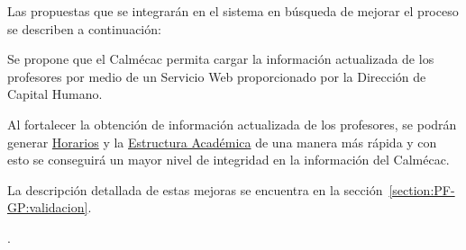 	Las propuestas que se integrarán en el sistema  en búsqueda de mejorar el proceso se describen a continuación:  
	
\begin{Citemize}
	\item Se propone que el Calmécac permita cargar la información actualizada de los profesores por medio de un Servicio Web proporcionado por la Dirección de Capital Humano.
	\item Al fortalecer la obtención de información actualizada de los profesores, se podrán generar \hyperlink{PF:PF-PHR}{Horarios} y la  \hyperlink{PF:PF-EA}{Estructura Académica} de una manera más rápida y con esto se conseguirá un mayor nivel de integridad en la información del Calmécac.
	
		La descripción detallada de estas mejoras se encuentra en la sección~\ref{section:PF-GP:validacion}.
	
	\pagebreak
	.	
\end{Citemize}
%		
